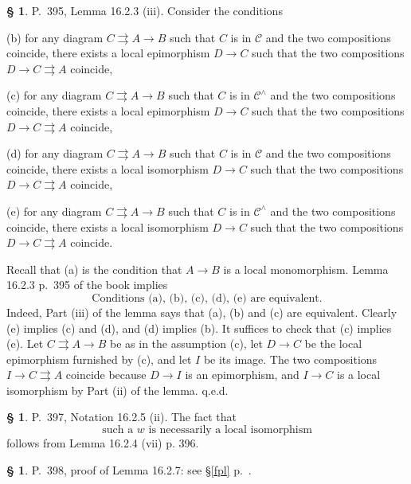 \documentclass[12pt]{article}
\theoremstyle{remark}
\theoremstyle{definition}
\newtheorem{s}[thm]{\S}
\newcommand{\nn}{\noindent}
\newcommand{\C}{\mathcal C}
\newcommand{\parar}{\rightrightarrows}
\begin{document}
%

\begin{s}\label{s1623}
P.~395, Lemma 16.2.3 (iii). Consider the conditions

\nn(b) for any diagram $C\parar A\to B$ such that $C$ is in $\C$ and the two compositions coincide, there exists a local epimorphism $D\to C$ such that the two compositions $D\to C\parar A$ coincide,

\nn(c) for any diagram $C\parar A\to B$ such that $C$ is in $\C^\wedge$ and the two compositions coincide, there exists a local epimorphism $D\to C$ such that the two compositions $D\to C\parar A$ coincide,

\nn(d) for any diagram $C\parar A\to B$ such that $C$ is in $\C$ and the two compositions coincide, there exists a local isomorphism $D\to C$ such that the two compositions $D\to C\parar A$ coincide,

\nn(e) for any diagram $C\parar A\to B$ such that $C$ is in $\C^\wedge$ and the two compositions coincide, there exists a local isomorphism $D\to C$ such that the two compositions $D\to C\parar A$ coincide.

Recall that (a) is the condition that $A\to B$ is a local monomorphism. Lemma 16.2.3 p.~395 of the book implies 
%
\begin{equation}\label{e1623}
\text{Conditions (a), (b), (c), (d), (e) are equivalent.}
\end{equation}
%
Indeed, Part (iii) of the lemma says that (a), (b) and (c) are equivalent. Clearly (e) implies (c) and (d), and (d) implies (b). It suffices to check that (c) implies (e). Let $C\parar A\to B$ be as in the assumption (c), let $D\to C$ be the local epimorphism furnished by (c), and let $I$ be its image. The two compositions $I\to C\parar A$ coincide because $D\to I$ is an epimorphism, and $I\to C$ is a local isomorphism by Part (ii) of the lemma. q.e.d.
\end{s}

%

\begin{s} 
P.~397, Notation 16.2.5 (ii). The fact that 
\begin{equation}\label{1625}
\text{such a $w$ is necessarily a local isomorphism}
\end{equation}
follows from Lemma 16.2.4 (vii) p. 396.
\end{s}

%

\begin{s} 
P.~398, proof of Lemma 16.2.7: see \S\ref{fpl} p.~\pageref{fpl}.
\end{s}
\end{document}
